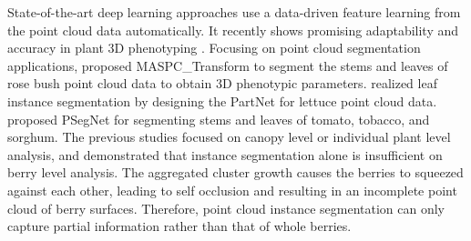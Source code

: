 \documentclass[12pt]{article}
\begin{document}
State-of-the-art deep learning approaches use a data-driven feature learning from the point cloud data automatically. 
It recently shows promising adaptability and accuracy in plant 3D phenotyping \citep{schneider_predicting_2020,scholer_automated_2015,rostami_survey_2019,du_pst_2023}. Focusing on point cloud segmentation applications, 
\citet{li_maspc_2022} proposed MASPC\_Transform to segment the stems and leaves of rose bush point cloud data to obtain 3D phenotypic parameters. 
\citet{wang_3d_2022} realized leaf instance segmentation by designing the PartNet for lettuce point cloud data. 
\citet{li_psegnet_2022} proposed PSegNet for segmenting stems and leaves of tomato, tobacco, and sorghum. 
The previous studies focused on canopy level or individual plant level analysis, and demonstrated that instance segmentation alone is insufficient on berry level analysis. 
The aggregated cluster growth \citep{du_instance_2023} causes the berries to squeezed against each other, leading to self occlusion and resulting in an incomplete point cloud of berry surfaces. 
Therefore, point cloud instance segmentation can only capture partial information rather than that of whole berries.
\end{document}
